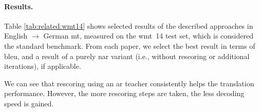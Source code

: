 \paragraph{Results.} Table \ref{tab:related:wmt14} shows selected results of
the described approaches in English $\rightarrow$ German \ac{mt}, measured on
the \acs{wmt}~14 test set, which is considered the standard benchmark. From
each paper, we select the best result in terms of \acs{bleu}, and a result of a
purely \acl{nar} variant (i.e., without rescoring or additional iterations), if
applicable.

We can see that rescoring using an \acl{ar} teacher consistently helps the
translation performance. However, the more rescoring steps are taken, the less
decoding speed is gained.

